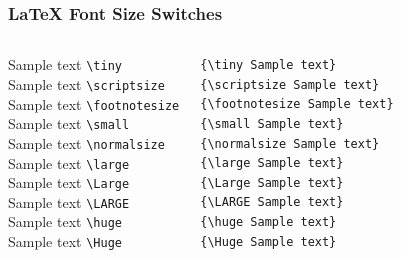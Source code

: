 \documentclass[aspectratio=169,10pt]{beamer}
\begin{document}
\begin{frame}[fragile]
    \frametitle{LaTeX Font Size Switches}
    \begin{columns}[T]
        {\tiny Sample text} \hfill\texttt{\textbackslash tiny}\\[1pt]
        {\scriptsize Sample text} \hfill\texttt{\textbackslash scriptsize}\\[1pt]
        {\footnotesize Sample text} \hfill\texttt{\textbackslash footnotesize}\\[1pt]
        {\small Sample text} \hfill\texttt{\textbackslash small}\\[1pt]
        {\normalsize Sample text} \hfill\texttt{\textbackslash normalsize}\\[1pt]
        {\large Sample text} \hfill\texttt{\textbackslash large}\\[1pt]
        {\Large Sample text} \hfill\texttt{\textbackslash Large}\\[1pt]
        {\LARGE Sample text} \hfill\texttt{\textbackslash LARGE}\\[1pt]
        {\huge Sample text} \hfill\texttt{\textbackslash huge}\\[1pt]
        {\Huge Sample text} \hfill\texttt{\textbackslash Huge}
        \begin{lstlisting}[language={[LaTeX]TeX}]
{\tiny Sample text}
{\scriptsize Sample text}
{\footnotesize Sample text}
{\small Sample text}
{\normalsize Sample text}
{\large Sample text}
{\Large Sample text}
{\LARGE Sample text}
{\huge Sample text}
{\Huge Sample text}
        \end{lstlisting}
    \end{columns}
\end{frame}
\end{document}

